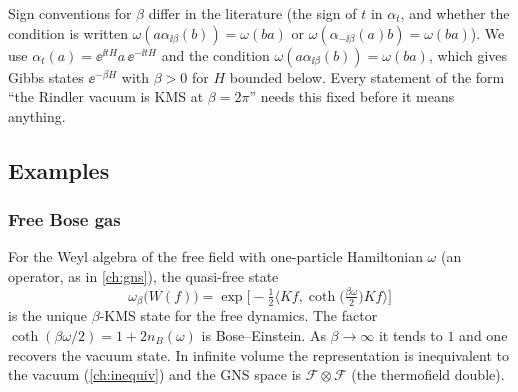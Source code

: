\begin{whatwrong}
Sign conventions for $\beta$ differ in the literature (the sign of $t$ in $\alpha_t$, and whether the condition is written $\omega(a\alpha_{\ii\beta}(b))=\omega(ba)$ or $\omega(\alpha_{-\ii\beta}(a)b)=\omega(ba)$). We use $\alpha_t(a)=\ee^{\ii tH}a\,\ee^{-\ii tH}$ and the condition $\omega(a\alpha_{\ii\beta}(b))=\omega(ba)$, which gives Gibbs states $\ee^{-\beta H}$ with $\beta>0$ for $H$ bounded below. Every statement of the form ``the Rindler vacuum is KMS at $\beta=2\pi$'' needs this fixed before it means anything.
\end{whatwrong}

\subsection{Examples}

\subsubsection{Free Bose gas}
For the Weyl algebra of the free field with one-particle Hamiltonian $\omega$ (an operator, as in \cref{ch:gns}), the quasi-free state
\begin{equation}
\omega_\beta\big(W(f)\big)=\exp\Big[-\tfrac12\big\langle Kf,\coth\!\big(\tfrac{\beta\omega}{2}\big)Kf\big\rangle\Big]
\end{equation}
is the unique $\beta$-KMS state for the free dynamics. The factor $\coth(\beta\omega/2)=1+2n_B(\omega)$ is Bose--Einstein. As $\beta\to\infty$ it tends to $1$ and one recovers the vacuum state. In infinite volume the representation is inequivalent to the vacuum (\cref{ch:inequiv}) and the GNS space is $\mathcal F\otimes\mathcal F$ (the thermofield double).

